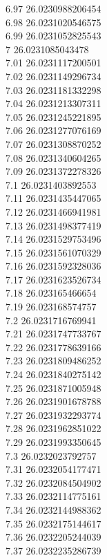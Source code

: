 {6.97	26.0230988206454\\
6.98	26.0231020546575\\
6.99	26.0231052825543\\
7	26.0231085043478\\
7.01	26.0231117200501\\
7.02	26.0231149296734\\
7.03	26.0231181332298\\
7.04	26.0231213307311\\
7.05	26.0231245221895\\
7.06	26.0231277076169\\
7.07	26.0231308870252\\
7.08	26.0231340604265\\
7.09	26.0231372278326\\
7.1	26.0231403892553\\
7.11	26.0231435447065\\
7.12	26.0231466941981\\
7.13	26.0231498377419\\
7.14	26.0231529753496\\
7.15	26.0231561070329\\
7.16	26.0231592328036\\
7.17	26.0231623526734\\
7.18	26.023165466654\\
7.19	26.023168574757\\
7.2	26.0231716769941\\
7.21	26.0231747733767\\
7.22	26.0231778639166\\
7.23	26.0231809486252\\
7.24	26.0231840275142\\
7.25	26.0231871005948\\
7.26	26.0231901678788\\
7.27	26.0231932293774\\
7.28	26.0231962851022\\
7.29	26.0231993350645\\
7.3	26.0232023792757\\
7.31	26.0232054177471\\
7.32	26.0232084504902\\
7.33	26.0232114775161\\
7.34	26.0232144988362\\
7.35	26.0232175144617\\
7.36	26.0232205244039\\
7.37	26.0232235286739\\
}
